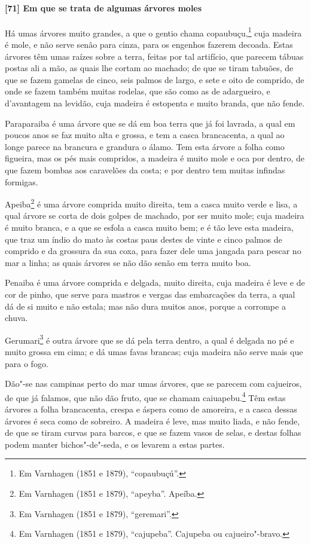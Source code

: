 \begin{linenumbers}
\paragraph{[71] Em que se trata de algumas árvores moles}\quad
Há umas árvores muito grandes, a que o gentio chama copaubuçu,\footnote{ Em Varnhagen
(1851 e 1879), ``copaubuçú''.} cuja madeira é mole, e não serve senão para cinza, para os
engenhos fazerem decoada. Estas árvores têm umas raízes sobre a terra, feitas por tal
artifício, que parecem tábuas postas ali a mão, as quais lhe cortam ao machado; de que se
tiram tabuões, de que se fazem gamelas de cinco, seis palmos de largo, e sete e oito de
comprido, de onde se fazem também muitas rodelas, que são como as de adargueiro, e
d'avantagem na levidão, cuja madeira é estopenta e muito branda, que não fende.

Paraparaiba é uma árvore que se dá em boa terra que já foi lavrada, a qual em poucos anos
se faz muito alta e grossa, e tem a casca brancacenta, a qual ao longe parece na brancura
e grandura o álamo. Tem esta árvore a folha como figueira, mas os pés mais compridos, a
madeira é muito mole e oca por dentro, de que fazem bombas aos caravelões da costa; e por
dentro tem muitas infindas formigas.

Apeiba\footnote{ Em Varnhagen (1851 e 1879), ``apeyba''. Apeíba.} é uma árvore comprida
muito direita, tem a casca muito verde e lisa, a qual árvore se corta de dois golpes de
machado, por ser muito mole; cuja madeira é muito branca, e a que se esfola a casca muito
bem; e é tão leve esta madeira, que traz um índio do mato às costas paus destes de vinte e
cinco palmos de comprido e da grossura da sua coxa, para fazer dele uma jangada para
pescar no mar a linha; as quais árvores se não dão senão em terra muito boa.

Penaiba é uma árvore comprida e delgada, muito direita, cuja madeira é leve e de cor de
pinho, que serve para mastros e vergas das embarcações da terra, a qual dá de si muito e
não estala; mas não dura muitos anos, porque a corrompe a chuva.

Gerumari\footnote{ Em Varnhagen (1851 e 1879), ``geremari''.} é outra árvore que se dá
pela terra dentro, a qual é delgada no pé e muito grossa em cima; e dá umas favas brancas;
cuja madeira não serve mais que para o fogo.

Dão"-se nas campinas perto do mar umas árvores, que se parecem com cajueiros, de que já
falamos, que não dão fruto, que se chamam caiuapebu.\footnote{ Em Varnhagen (1851 e 1879),
``cajupeba''. Cajupeba ou cajueiro"-bravo.} Têm estas árvores a folha brancacenta, crespa e
áspera como de amoreira, e a casca dessas árvores é seca como de sobreiro. A madeira é
leve, mas muito liada, e não fende, de que se tiram curvas para barcos, e que se fazem
vasos de selas, e destas folhas podem manter bichos"-de"-seda, e os levarem a estas partes.


\end{linenumbers}
